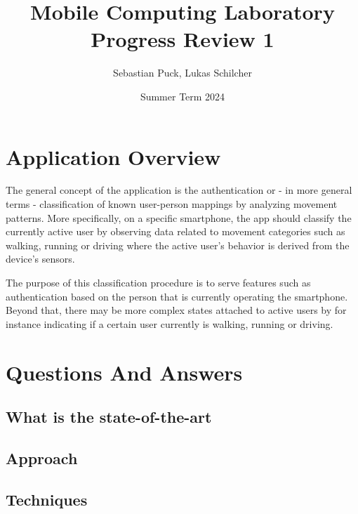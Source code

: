 \documentclass{article}
\author{Sebastian Puck, Lukas Schilcher}
\date{Summer Term 2024}
\title{Mobile Computing Laboratory\\Progress Review 1}
\begin{document}
\maketitle
\section{Application Overview}
The general concept of the application is the authentication or - in more general terms - classification of known user-person mappings by analyzing movement patterns. More specifically, on a specific smartphone, the app should classify the currently active user by observing data related to movement categories such as walking, running or driving where the active user's behavior is derived from the device's sensors.

The purpose of this classification procedure is to serve features such as authentication based on the person that is currently operating the smartphone. Beyond that, there may be more complex states attached to active users by for instance indicating if a certain user currently is walking, running or driving.

\section{Questions And Answers}
\subsection{What is the state-of-the-art}

\subsection{Approach}

\subsection{Techniques}
\end{document}
